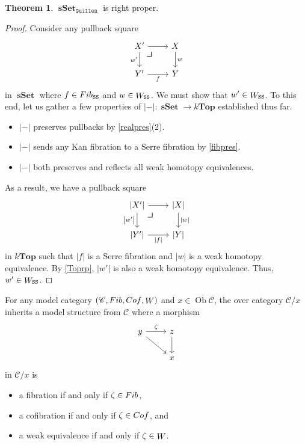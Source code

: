 \documentclass[10pt,letterpaper,cm]{nupset}
\theoremstyle{definition}
\theoremstyle{theorem}
\newtheorem{theorem}[definition]{Theorem}
\theoremstyle{remark}
\DeclareMathOperator{\ob}{Ob}
\newcommand{\0}{\mathbf{0}}
\newcommand{\1}{\mathbf{1}}
\newcommand{\2}{\mathbf{2}}
\DeclareMathOperator{\sset}{\mathbf{sSet}}
\renewcommand{\c}{\mathscr{C}}
\DeclareMathOperator{\fib}{\mathnormal{Fib}}
\DeclareMathOperator{\cof}{\mathnormal{Cof}}
\DeclareMathOperator{\we}{\mathnormal{W}}
\newcommand{\bi}{\begin{itemize}}
\newcommand{\ei}{\end{itemize}}
\begin{document}
\begin{theorem}\label{RProp}
$\sset_{\mathtt{Quillen}}$ is right proper.
\end{theorem}
\begin{proof}
Consider any pullback square
\[
\begin{tikzcd}
X' \arrow[r]
\arrow[dr, phantom, "\scalebox{1.5}{\color{black}$\lrcorner$}" , very near start, color=black]
 \arrow[d, "w'"'] & X \arrow[d, "w"] \\
Y' \arrow[r, "f"']            & Y               
\end{tikzcd}
\] in $\sset$ where $f\in \fib_{\mathtt{SS}}$ and $w \in \we_{\mathtt{SS}}$. We must show that $w' \in \we_{\mathtt{SS}}$.
 To this end, let us gather a few properties of $\left\lvert{-}\right\rvert : \sset \to k\mathbf{Top}$ established thus far.

\bi
\item $\left\lvert{-}\right\rvert$ preserves pullbacks by \cref{realpres}(2).
\item $\left\lvert{-}\right\rvert$ sends any Kan fibration to a Serre fibration by \cref{fibpres}.
\item $\left\lvert{-}\right\rvert$ both preserves and reflects all weak homotopy equivalences.
\ei

As a result, we have a pullback square
\[
\begin{tikzcd}
\left\lvert{X'}\right\rvert \arrow[r]
\arrow[dr, phantom, "\scalebox{1.5}{\color{black}$\lrcorner$}" , very near start, color=black] 
 \arrow[d, "\left\lvert{w'}\right\rvert"'] & \left\lvert{X}\right\rvert \arrow[d, "\left\lvert{w}\right\rvert"] \\
\left\lvert{Y'}\right\rvert \arrow[r, "\left\lvert{f}\right\rvert"']            & \left\lvert{Y}\right\rvert                                        
\end{tikzcd}
\]  in $k\mathbf{Top}$ such that $\left\lvert{f}\right\rvert$ is a Serre fibration and $\left\lvert{w}\right\rvert$ is a weak homotopy equivalence. By \cref{Toprp}, $\left\lvert{w'}\right\rvert$ is also a weak homotopy equivalence. Thus, $w' \in  \we_{\mathtt{SS}}$.
\end{proof}

\smallskip

For any model category $\left(\c, \fib, \cof, \we\right)$ and $x\in \ob{\c}$, the over category $\c/x$ inherits a model structure from $\c$ where a  morphism
\[
\begin{tikzcd}
y \arrow[rd] \arrow[r, "\zeta"] & z \arrow[d] \\
                       & x          
\end{tikzcd}
\]
in $\c/x$ is
\bi
\item a fibration if and only if $\zeta \in \fib$,
\item a cofibration if and only if $\zeta \in \cof$, and
\item a weak equivalence if and only if $\zeta \in \we$.
\ei
\end{document}
